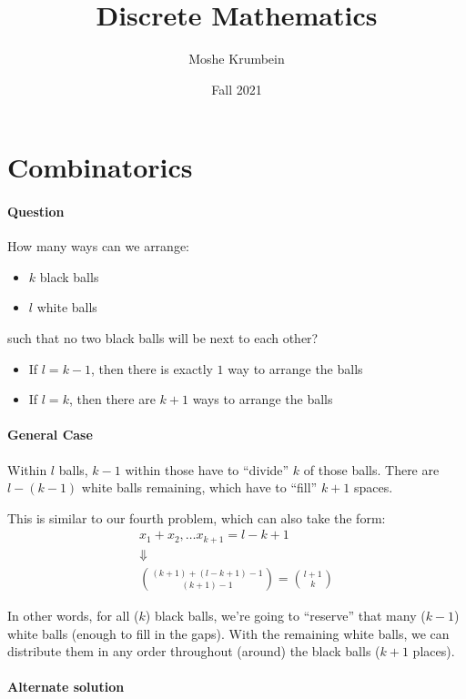\documentclass[00_complete]{subfiles}
\title{Discrete Mathematics}
\author{Moshe Krumbein}
\date{Fall 2021}
\begin{document}

\section{Combinatorics}

\paragraph{Question}

How many ways can we arrange:

\begin{itemize}
\item $k$ black balls
\item $l$ white balls
\end{itemize}

such that no two black balls will be next to each other?

\begin{itemize}
 \item If $l=k-1$, then there is exactly $1$ way to arrange the balls
 \item If $l = k$, then there are $k+1$ ways to arrange the balls
\end{itemize}

\paragraph{General Case}

Within $l$ balls, $k-1$ within those have to ``divide'' $k$ of those balls. There
are $l-(k-1)$ white balls remaining, which have to ``fill'' $k+1$ spaces.

This is similar to our fourth problem, which can also take the form:
$$
\begin{gathered}
    x_1+x_2, \dots x_{k+1} = l-k+1 \\
    \Downarrow \\
    \binom{(k+1)+(l-k+1)-1}{(k+1)-1} = \binom{l+1}{k}
\end{gathered}
$$

In other words, for all ($k$) black balls, we're going to ``reserve'' that many
($k-1$) white balls (enough to fill in the gaps). With the remaining white balls, we can
distribute them in any order throughout (around) the black balls ($k+1$
places).

\paragraph{Alternate solution}
\end{document}
